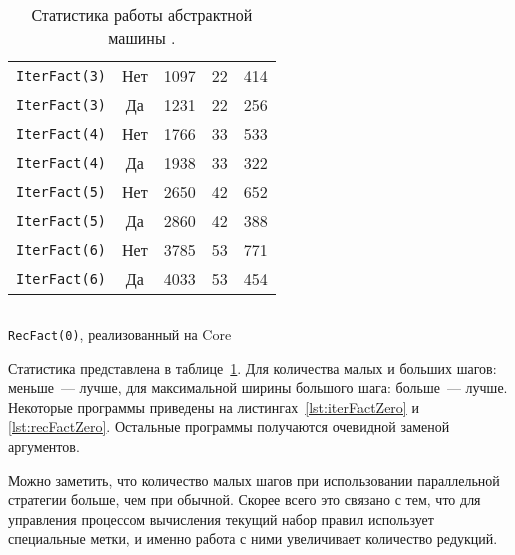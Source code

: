 \begin{table}
\begin{center}
\begin{tabular}{lcrrr}
            \midrule
            \texttt{IterFact(3)}                                                      & Нет & 1097 & 22 & 414 \\
            \texttt{IterFact(3)}                                                      & Да  & 1231 & 22 & 256 \\
            \midrule
            \texttt{IterFact(4)}                                                      & Нет & 1766 & 33 & 533 \\
            \texttt{IterFact(4)}                                                      & Да  & 1938 & 33 & 322 \\
            \midrule
            \texttt{IterFact(5)}                                                      & Нет & 2650 & 42 & 652 \\
            \texttt{IterFact(5)}                                                      & Да  & 2860 & 42 & 388 \\
            \midrule
            \texttt{IterFact(6)}                                                      & Нет & 3785 & 53 & 771 \\
            \texttt{IterFact(6)}                                                      & Да  & 4033 & 53 & 454 \\
            \bottomrule
        \end{tabular}
    \end{center}
    \caption{Статистика работы абстрактной машины \INs{}.}
    \label{table:stats}
\end{table}

\begin{listing}
    \inputminted[fontsize=\footnotesize, breaklines]{ocaml}{figures/recFactZero.lml}
    \caption{\texttt{RecFact(0)}, реализованный на Core}
    \label{lst:recFactZero}
\end{listing}

Статистика представлена в таблице~\ref{table:stats}.
Для количества малых и больших шагов: меньше~--- лучше, для максимальной ширины большого шага: больше~--- лучше.
Некоторые программы приведены на листингах~\ref{lst:iterFactZero} и \ref{lst:recFactZero}.
Остальные программы получаются очевидной заменой аргументов.

Можно заметить, что количество малых шагов при использовании параллельной стратегии больше, чем при обычной. Скорее всего это связано с тем, что для управления процессом вычисления текущий набор правил использует специальные метки, и именно работа с ними увеличивает количество редукций.

